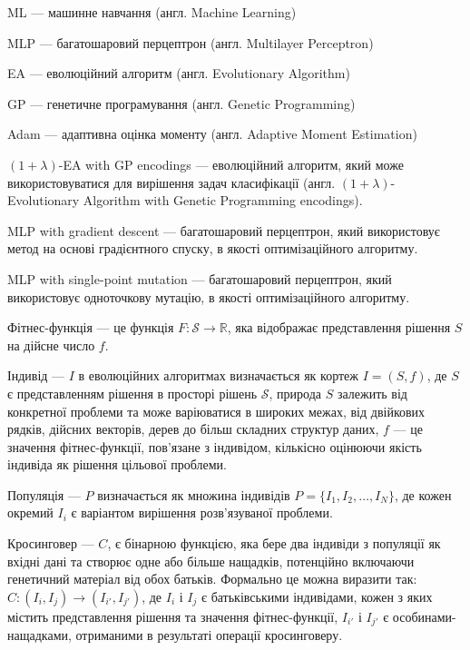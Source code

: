 ML --- машинне навчання (англ. Machine Learning)

MLP --- багатошаровий перцептрон (англ. Multilayer Perceptron)

EA --- еволюційний алгоритм (англ. Evolutionary Algorithm)

GP --- генетичне програмування (англ. Genetic Programming)

Adam --- адаптивна оцінка моменту (англ. Adaptive Moment Estimation)

$(1+\lambda)$-EA with GP encodings --- еволюційний алгоритм, який може використовуватися для вирішення задач класифікації (англ. $(1+\lambda)$-Evolutionary Algorithm with Genetic Programming encodings).

MLP with gradient descent --- багатошаровий перцептрон, який використовує метод на основі градієнтного спуску, в якості оптимізаційного алгоритму.

MLP with single-point mutation --- багатошаровий перцептрон, який використовує одноточкову мутацію, в якості оптимізаційного алгоритму.

Фітнес-функція --- це функція \( F: \mathcal{S} \rightarrow \mathbb{R} \), яка відображає представлення рішення \( S \) на дійсне число \( f \).

Індивід --- \( I \) в еволюційних алгоритмах визначається як кортеж \( I = (S, f) \), де \( S \) є представленням рішення в просторі рішень \( \mathcal{S} \), природа \( S \) залежить від конкретної проблеми та може варіюватися в широких межах, від двійкових рядків, дійсних векторів, дерев до більш складних структур даних, \( f \) — це значення фітнес-функції, пов’язане з індивідом, кількісно оцінюючи якість індивіда як рішення цільової проблеми.

Популяція --- \( P \) визначається як множина індивідів \( P = \{I_1, I_2, \ldots, I_N\} \), де кожен окремий \( I_i \) є варіантом вирішення розв'язуваної проблеми.

Кросинговер --- \( C \), є бінарною функцією, яка бере два індивіди з популяції як вхідні дані та створює одне або більше нащадків, потенційно включаючи генетичний матеріал від обох батьків. Формально це можна виразити так: \( C: (I_i, I_j) \rightarrow (I_{i'}, I_{j'}) \), де \( I_i \) і \( I_j \) є батьківськими індивідами, кожен з яких містить представлення рішення та значення фітнес-функції, \( I_{i'} \) і \( I_{j'} \) є особинами-нащадками, отриманими в результаті операції кросинговеру.

